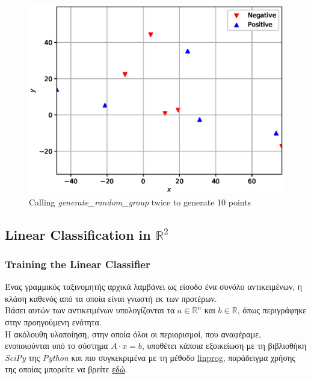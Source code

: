 \documentclass[12pt]{article}
\newcommand{\R}{\mathbb{R}}
\newenvironment{matlab}
	{\begin{figure}[H]\centering\captionsetup{justification=centering}}
	{\end{figure}}
\begin{document}
\begin{matlab}
    \includegraphics[scale=0.75]{figures/random}
    \caption{Calling \textit{generate\_random\_group} twice to generate 10 points }
\end{matlab}

\subsection{Linear Classification in \( \R^2 \)}

\subsubsection{Training the Linear Classifier}

Ένας γραμμικός ταξινομητής αρχικά λαμβάνει ως είσοδο ένα συνόλο αντικειμένων,
η κλάση καθενός από τα οποία είναι γνωστή εκ των προτέρων. \\

Βάσει αυτών των αντικειμένων υπολογίζονται τα \( a \in \R^{n} \) και \( b \in \R \),
όπως περιγράφηκε στην προηγούμενη ενότητα. \\

Η ακόλουθη υλοποίηση, στην οποία όλοι οι περιορισμοί,
που αναφέραμε, ενοποιούνται υπό το σύστημα \( Α \cdot x = b \),
υποθέτει κάποια εξοικείωση με τη βιβλιοθήκη \textit{SciPy} της \textit{Python}
και πιο συγκεκριμένα με τη μέθοδο
\href{https://docs.scipy.org/doc/scipy/reference/optimize.linprog-simplex.html}{linprog},
παράδειγμα χρήσης της οποίας μπορείτε να βρείτε
\href{https://stackoverflow.com/questions/45873783/python-linprog-minimization-simplex-method}{εδώ}. \\
\end{document}
